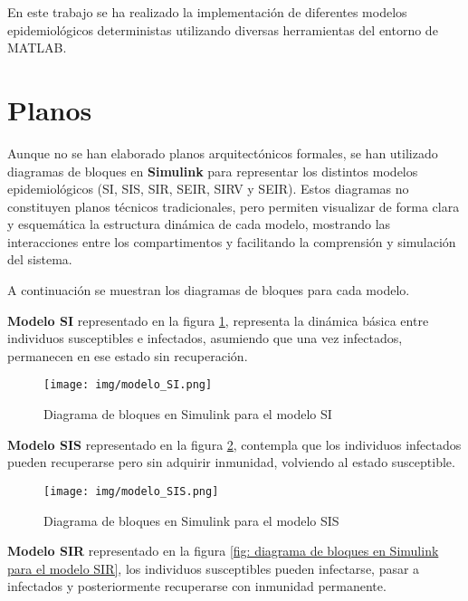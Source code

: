 En este trabajo se ha realizado la implementación de diferentes modelos epidemiológicos deterministas utilizando diversas herramientas del entorno de MATLAB.
\section{Planos}
Aunque no se han elaborado planos arquitectónicos formales, se han utilizado diagramas de bloques en \textbf{Simulink} para representar los distintos modelos epidemiológicos (SI, SIS, SIR, SEIR, SIRV y SEIR). 
Estos diagramas no constituyen planos técnicos tradicionales, pero permiten visualizar de forma clara y esquemática la estructura dinámica de cada modelo, mostrando las interacciones entre los compartimentos y facilitando la comprensión y simulación del sistema.

A continuación se muestran los diagramas de bloques para cada modelo.

\textbf{Modelo SI} representado en la figura \ref{fig: diagrama de bloques en Simulink para el modelo SI}, representa la dinámica básica entre individuos susceptibles e infectados, asumiendo que una vez infectados, permanecen en ese estado sin recuperación.
\begin{figure}[H]
        \centering
        \texttt{[image: img/modelo\_SI.png]}
        \caption{Diagrama de bloques en Simulink para el modelo SI}
        \label{fig: diagrama de bloques en Simulink para el modelo SI}
        \vspace{0.5cm} %
\end{figure}

\textbf{Modelo SIS} representado en la figura \ref{fig: diagrama de bloques en Simulink para el modelo SIS}, contempla que los individuos infectados pueden recuperarse pero sin adquirir inmunidad, volviendo al estado susceptible.
\begin{figure}[H]
        \centering
        \texttt{[image: img/modelo\_SIS.png]}
        \caption{Diagrama de bloques en Simulink para el modelo SIS}
        \label{fig: diagrama de bloques en Simulink para el modelo SIS}
        \vspace{0.5cm} %
\end{figure}

\textbf{Modelo SIR} representado en la figura \ref{fig: diagrama de bloques en Simulink para el modelo SIR}, los individuos susceptibles pueden infectarse, pasar a infectados y posteriormente recuperarse con inmunidad permanente.


